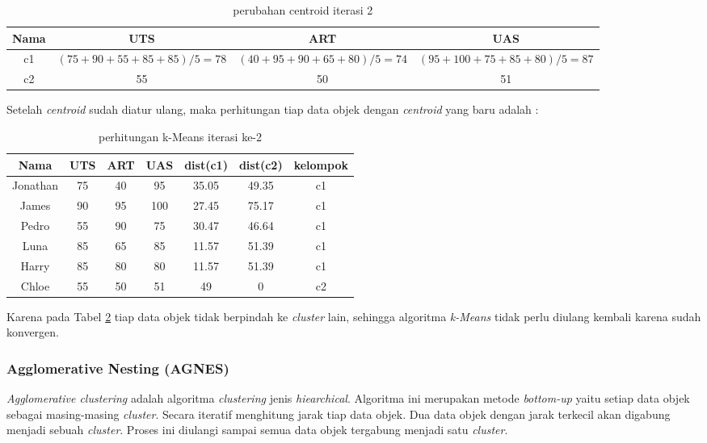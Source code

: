 \begin{table}[ht]
\centering
\begin{tabular}{|c|c|c|c|}
\hline 
Nama & UTS & ART & UAS \\ 
\hline 
c1 & $(75+90+55+85+85)/5 =  78$ & $(40+95+90+65+80)/5 = 74$ & $(95+100+75+85+80)/5 = 87$ \\ 
\hline 
c2 & 55 & 50 & 51 \\ 
\hline 
\end{tabular} 
\caption{perubahan centroid iterasi 2}
\label{tab:centroid1}
\end{table}

Setelah \textit{centroid} sudah diatur ulang, maka perhitungan tiap data objek dengan \textit{centroid} yang baru adalah : 

\begin{table}[ht]
\centering
\begin{tabular}{|c|c|c|c|c|c|c|}
\hline 
Nama & UTS & ART & UAS & dist(c1) & dist(c2) & kelompok \\ 
\hline 
Jonathan & 75 & 40 & 95 & 35.05 & 49.35 & c1 \\ 
\hline 
James & 90 & 95 & 100 & 27.45 & 75.17 & c1 \\ 
\hline 
Pedro & 55 & 90 & 75 & 30.47 & 46.64 & c1 \\ 
\hline 
Luna & 85 & 65 & 85 & 11.57 & 51.39 & c1 \\ 
\hline 
Harry & 85 & 80 & 80 & 11.57 & 51.39 & c1 \\ 
\hline 
Chloe & 55 & 50 & 51 & 49 & 0 & c2 \\ 
\hline 
\end{tabular} 
\caption{perhitungan k-Means iterasi ke-2}
\label{tab:kmeansiterasi2}
\end{table}
Karena pada Tabel \ref{tab:kmeansiterasi2} tiap data objek tidak berpindah ke \textit{cluster} lain, sehingga algoritma \textit{k-Means} tidak perlu diulang kembali karena sudah konvergen.


\subsubsection{Agglomerative Nesting (AGNES)}
\textit{Agglomerative clustering} adalah algoritma \textit{clustering} jenis \textit{hiearchical}. Algoritma ini merupakan metode \textit{bottom-up} yaitu setiap data objek sebagai masing-masing \textit{cluster}. Secara iteratif menghitung jarak tiap data objek. Dua data objek dengan jarak terkecil akan digabung menjadi sebuah \textit{cluster}. Proses ini diulangi sampai semua data objek tergabung menjadi satu \textit{cluster}. 

